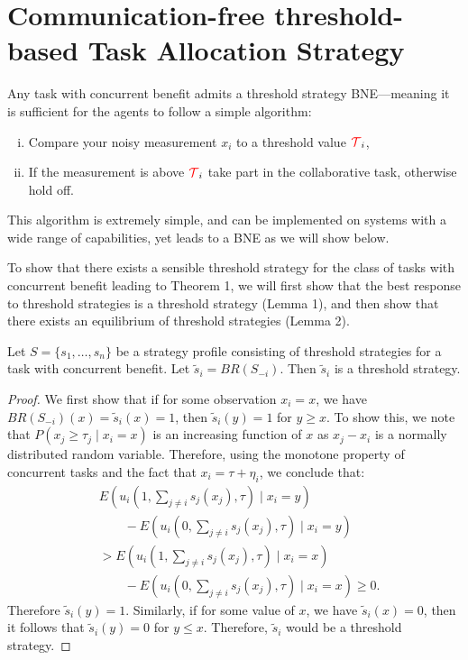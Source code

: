 \documentclass[smallextended]{svjour3}       %
\newcommand{\edit}[1]{\textcolor{red}{#1}}
\def\td{\edit{\mathcal{T}}}   %
\begin{document}
\section{Communication-free threshold-based Task Allocation Strategy}\label{sec:discretethreshold}
Any task with concurrent benefit admits a threshold strategy BNE---meaning it is sufficient for the agents to follow a simple algorithm: 
\begin{enumerate}[(i)]
\item Compare your noisy measurement $x_i$ to a threshold value $\td_i$,
\item If the measurement is above $\td_i$ take part in the collaborative task, otherwise hold off.
\end{enumerate}
This algorithm is extremely simple, and can be implemented on systems with a wide range of capabilities, yet leads to a BNE as we will show below.

To show that there exists a sensible threshold strategy for the class of tasks with concurrent benefit leading to Theorem 1, we will first show that the best response to threshold strategies is a threshold strategy (Lemma 1), and then show that there exists an equilibrium of threshold strategies \citep{Carlsson1993,Morris2000} (Lemma 2).

\setcounter{lemma}{0}

\begin{lemma}
Let $S=\{s_1,\ldots,s_n\}$ be a strategy profile consisting of threshold strategies for a task with  concurrent benefit. Let $\tilde{s}_i=BR(S_{-i})$. Then $\tilde{s}_i$ is a threshold strategy. 
\end{lemma} 

\begin{proof}
We first show that if for some observation $x_i=x$, we have $BR(S_{-i})(x)=\tilde{s}_i(x)=1$, then $\tilde{s}_i(y)=1$ for $y\geq x$. To show this,  we note that $P(x_j\geq \tau_j\mid x_i=x)$ is an increasing function of $x$ as $x_j-x_i$ is a normally distributed random variable. Therefore, using the monotone property of concurrent tasks and the fact that $x_i=\tau+\eta_i$, we conclude that:
\vspace{-5px}
\begin{align*}
&E(u_i(1,\sum_{j\not=i}s_j(x_j),\tau)\mid x_i=y)\\ 
&\qquad-E(u_i(0,\sum_{j\not=i}s_j(x_j),\tau)\mid x_i=y)\\ 
&>E(u_i(1,\sum_{j\not=i}s_j(x_j),\tau)\mid x_i=x)\\
&\qquad-E(u_i(0,\sum_{j\not=i}s_j(x_j),\tau)\mid x_i=x)\geq 0.
\end{align*}
Therefore $\tilde{s}_i(y)=1$. Similarly, if for some value of $x$, we have $\tilde{s}_i(x)=0$, then it follows that $\tilde{s}_i(y)=0$ for $y\leq x$. Therefore, $\tilde{s}_i$ would be a threshold strategy.  
\end{proof}
\end{document}
